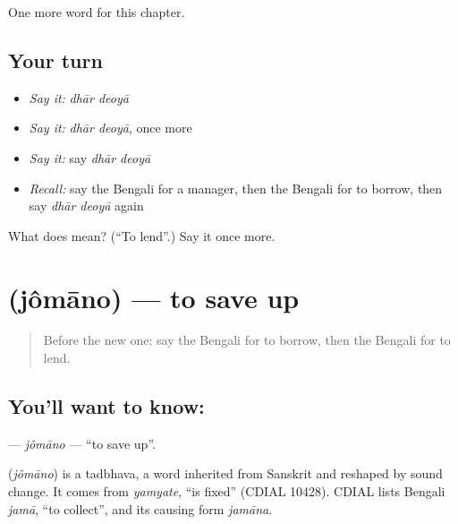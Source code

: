 \begin{grammarlens}[title={What you've built}]
One more word for this chapter.
\end{grammarlens}

\subsection*{Your turn}
\begin{itemize}
\raggedright
  \item \emph{Say it:} \emph{dhār deoyā}
  \item \emph{Say it:} \emph{dhār deoyā}, once more
  \item \emph{Say it:} say \emph{dhār deoyā}
  \item \emph{Recall:} say the Bengali for a manager, then the Bengali for to borrow, then say \emph{dhār deoyā} again
\end{itemize}

\begin{tcolorbox}[breakable,colback=teal!4,colframe=teal!35!black,title={Before you move on}]
What does   mean? (\textquotedblleft{}To lend\textquotedblright{}.) Say it once more.
\end{tcolorbox}
\section[\texorpdfstring{\bn{জমানো} (jômāno)}{জমানো (jômāno)}]{ (jômāno) — to save up}

\label{lesson:BN-C209-jomano}



\begin{quote}
Before the new one: say the Bengali for to borrow, then the Bengali for to lend.
\end{quote}

\subsection*{You'll want to know: }
\textbf{} — \emph{jômāno} — \textquotedblleft{}to save up\textquotedblright{}.

\begin{cousinweb}
\textbf{} (\emph{jômāno}) is a tadbhava, a word inherited from Sanskrit and reshaped by sound change. It comes from \emph{yamyate}, \textquotedblleft{}is fixed\textquotedblright{} (CDIAL 10428). CDIAL lists Bengali \emph{jamā}, \textquotedblleft{}to collect\textquotedblright{}, and its causing form \emph{jamāna}.
\end{cousinweb}

